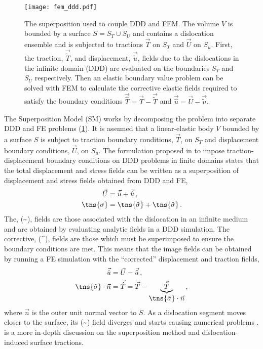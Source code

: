 \begin{figure}
    \centering
    \texttt{[image: fem\_ddd.pdf]}
    \caption[Superposition Model for DDD-FEM coupling.]{The superposition used to couple DDD and FEM. The volume $V$ is bounded by a surface $S = S_{T} \cup S_{U}$ and contains a dislocation ensemble and is subjected to tractions $\vec{T}$ on $S_{T}$ and $\vec{U}$ on $S_{u}$. First, the traction, $\vec{\tilde{T}}$, and displacement, $\vec{\tilde{u}}$, fields due to the dislocations in the infinite domain (DDD) are evaluated on the boundaries $S_{T}$ and $S_{U}$ respectively. Then an elastic boundary value problem can be solved with FEM to calculate the corrective elastic fields required to satisfy the boundary conditions $\vec{\hat{T}} = \vec{T} - \vec{\tilde{T}}$ and $\vec{\hat{u}} = \vec{U} - \vec{\tilde{u}}$.}
    \label{f:fem_ddd}
\end{figure}

The Superposition Model (SM) works by decomposing the problem into separate DDD and FE problems (\cref{f:fem_ddd}). It is assumed that a linear-elastic body $ V $ bounded by a surface $ S $ is subject to traction boundary conditions, $ \vec{T} $, on $ S_{T} $ and displacement boundary conditions, $ \vec{U} $, on $ S_{u} $. The formulation proposed in \cite{dismot} to impose traction-displacement boundary conditions on DDD problems in finite domains states that the total displacement and stress fields can be written as a superposition of displacement and stress fields obtained from DDD and FE,
\begin{subequations}
    \label{eq:superposition}
    \begin{align}
        \vec{U}      & = \vec{\tilde{u}} + \vec{\hat{u}}\,,            \\
        \tns{\sigma} & = \tns{\tilde{\sigma}} + \tns{\hat{\sigma}}\, .
    \end{align}
\end{subequations}
The, (\textasciitilde), fields are those associated with the dislocation in an infinite medium and are obtained by evaluating analytic fields in a DDD simulation. The corrective, (\textasciicircum), fields are those which must be superimposed to ensure the boundary conditions are met. This means that the image fields can be obtained by running a FE simulation with the ``corrected'' displacement and traction fields,
\begin{subequations}
    \begin{align}
        \vec{\hat{u}}                    & = \vec{U} - \vec{\tilde{u}}\,,                                                                                 \\
        \tns{\hat{\sigma}} \cdot \vec{n} & = \vec{\hat{T}} = \vec{T} - \underbrace{\vec{\tilde{T}}}_{\displaystyle{\tns{\tilde{\sigma}}}\cdot \vec{n}}\,,
    \end{align}
\end{subequations}
where $ \vec{n} $ is the outer unit normal vector to $ S $. As a dislocation segment moves closer to the surface, its (\textasciitilde) field diverges and starts causing numerical problems \cite{bdd}.  is a more in-depth discussion on the superposition method and dislocation-induced surface tractions.

